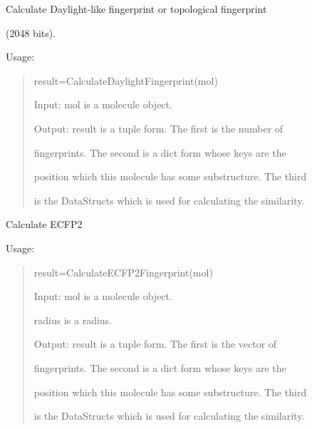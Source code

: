 \documentclass[letterpaper,10pt,english]{sphinxmanual}
\begin{document}
\begin{fulllineitems}
\label{reference/fingerprint:fingerprint.CalculateDaylightFingerprint}
Calculate Daylight-like fingerprint or topological fingerprint

(2048 bits).

Usage:
\begin{quote}

result=CalculateDaylightFingerprint(mol)

Input: mol is a molecule object.

Output: result is a tuple form. The first is the number of

fingerprints. The second is a dict form whose keys are the

position which this molecule has some substructure. The third

is the DataStructs which is used for calculating the similarity.
\end{quote}

\end{fulllineitems}


\begin{fulllineitems}
\label{reference/fingerprint:fingerprint.CalculateECFP2Fingerprint}
Calculate ECFP2

Usage:
\begin{quote}

result=CalculateECFP2Fingerprint(mol)

Input: mol is a molecule object.

radius is a radius.

Output: result is a tuple form. The first is the vector of

fingerprints. The second is a dict form whose keys are the

position which this molecule has some substructure. The third

is the DataStructs which is used for calculating the similarity.
\end{quote}

\end{fulllineitems}

\end{document}
